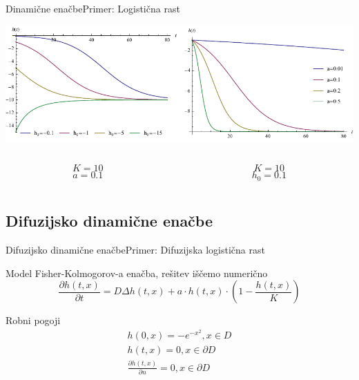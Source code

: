 \documentclass{beamer}
\begin{document}
\begin{frame}{Dinamične enačbe}{Primer: Logistična rast}
\begin{center}
  \hspace*{-0.09\textwidth}\includegraphics[width=1.2\textwidth]{slike/logisticna-rast}
  \footnotesize
\begin{columns}
  \begin{column}{0.5\textwidth}
  \[ K = 10 \]
  \[ a = 0.1 \]
  \end{column}
  \begin{column}{0.5\textwidth}
  \[ K = 10 \]
  \[ h_0 = 0.1 \]
  \end{column}
\end{columns}
\end{center}
\end{frame}

\subsection{Difuzijsko dinamične enačbe}

\begin{frame}{Difuzijsko dinamične enačbe}{Primer: Difuzijska logistična rast}
\begin{block}{Model}
  Fisher-Kolmogorov-a enačba, rešitev iščemo numerično
  \begin{equation} \frac{ \partial h(t,x) }{ \partial t} = D \Delta h(t,x) + a \cdot h(t,x) \cdot (1 - \frac{h(t,x)}{K}) \end{equation} 
\end{block}
\begin{block}{Robni pogoji}
        \begin{equation}
          \begin{aligned}
            h(0,x) =  - e^{-x^2}, x \in D \\
            h(t,x) = 0, x \in \partial D \\
            \frac{\partial h(t,x)}{\partial n} = 0, x \in \partial D \\
          \end{aligned}
        \end{equation}
\end{block}
\end{frame}
\end{document}

